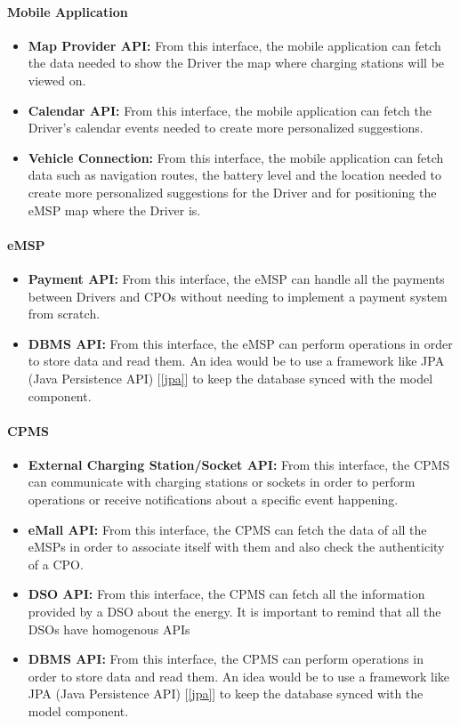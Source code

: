 \paragraph{Mobile Application}
\begin{itemize}
    \item \textbf{Map Provider API: }From this interface, the mobile application can fetch the data needed to show the Driver the map where charging stations will be viewed on.
    \item \textbf{Calendar API: }From this interface, the mobile application can fetch the Driver's calendar events needed to create more personalized suggestions.
    \item \textbf{Vehicle Connection: }From this interface, the mobile application can fetch data such as navigation routes, the battery level and the location needed to create more personalized suggestions for the Driver and for positioning the eMSP map where the Driver is.
\end{itemize}
\paragraph{eMSP}
\begin{itemize}
    \item \textbf{Payment API: }From this interface, the eMSP can handle all the payments between Drivers and CPOs without needing to implement a payment system from scratch.
    \item \textbf{DBMS API: }From this interface, the eMSP can perform operations in order to store data and read them. An idea would be to use a framework like JPA (Java Persistence API) [\ref{jpa}] to keep the database synced with the model component.
\end{itemize}
\paragraph{CPMS}
\begin{itemize}
    \item \textbf{External Charging Station/Socket API: }From this interface, the CPMS can communicate with charging stations or sockets in order to perform operations or receive notifications about a specific event happening.
    \item \textbf{eMall API: }From this interface, the CPMS can fetch the data of all the eMSPs in order to associate itself with them and also check the authenticity of a CPO.
    \item \textbf{DSO API: }From this interface, the CPMS can fetch all the information provided by a DSO about the energy. It is important to remind that all the DSOs have homogenous APIs
    \item \textbf{DBMS API: }From this interface, the CPMS can perform operations in order to store data and read them. An idea would be to use a framework like JPA (Java Persistence API) [\ref{jpa}] to keep the database synced with the model component.
\end{itemize}
\label{sec:otherDesign}
